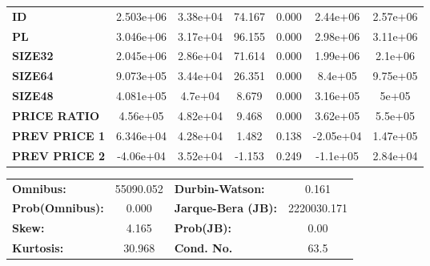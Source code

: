 \begin{center}
\begin{tabular}{lcccccc}
\textbf{ID}    &    2.503e+06  &     3.38e+04     &    74.167  &         0.000        &     2.44e+06    &     2.57e+06     \\
\textbf{PL}    &    3.046e+06  &     3.17e+04     &    96.155  &         0.000        &     2.98e+06    &     3.11e+06     \\
\textbf{SIZE32}    &    2.045e+06  &     2.86e+04     &    71.614  &         0.000        &     1.99e+06    &      2.1e+06     \\
\textbf{SIZE64}   &    9.073e+05  &     3.44e+04     &    26.351  &         0.000        &      8.4e+05    &     9.75e+05     \\
\textbf{SIZE48}   &    4.081e+05  &      4.7e+04     &     8.679  &         0.000        &     3.16e+05    &        5e+05     \\
\textbf{PRICE RATIO}   &     4.56e+05  &     4.82e+04     &     9.468  &         0.000        &     3.62e+05    &      5.5e+05     \\
\textbf{PREV PRICE 1}   &    6.346e+04  &     4.28e+04     &     1.482  &         0.138        &    -2.05e+04    &     1.47e+05     \\
\textbf{PREV PRICE 2}   &    -4.06e+04  &     3.52e+04     &    -1.153  &         0.249        &     -1.1e+05    &     2.84e+04     \\
\bottomrule
\end{tabular}
\begin{tabular}{lclc}
\textbf{Omnibus:}       & 55090.052 & \textbf{  Durbin-Watson:     } &      0.161   \\
\textbf{Prob(Omnibus):} &    0.000  & \textbf{  Jarque-Bera (JB):  } & 2220030.171  \\
\textbf{Skew:}          &    4.165  & \textbf{  Prob(JB):          } &       0.00   \\
\textbf{Kurtosis:}      &   30.968  & \textbf{  Cond. No.          } &       63.5   \\
\bottomrule
\end{tabular}
\end{center} 